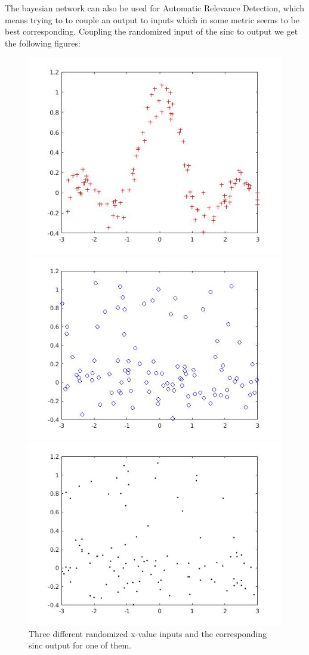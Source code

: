 \documentclass[•]{article}
\begin{document}
The bayesian network can also be used for Automatic Relevance Detection, which means trying to to couple an output to inputs which in some metric seems to be best corresponding. Coupling the randomized input of the sinc to output we get the following figures:

\begin{figure}[H]
\centering
\begin{minipage}{.3\textwidth}
\includegraphics[width=.8\textwidth]{inout1.jpg}
\end{minipage}
\begin{minipage}{.3\textwidth}
\includegraphics[width=.8\textwidth]{inout2.jpg}
\end{minipage}
\begin{minipage}{.3\textwidth}
\includegraphics[width=.8\textwidth]{inout3.jpg}
\end{minipage}
\caption{Three different randomized x-value inputs and the corresponding sinc output for one of them.}
\end{figure}
\end{document}
